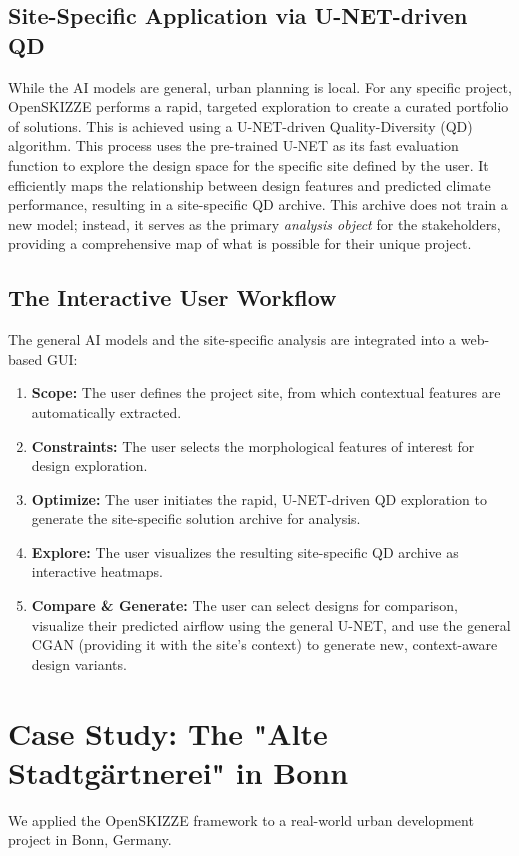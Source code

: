 \documentclass[times,final]{elsarticle}
\begin{document}
\subsection{Site-Specific Application via U-NET-driven QD}
While the AI models are general, urban planning is local. For any specific project, OpenSKIZZE performs a rapid, targeted exploration to create a curated portfolio of solutions. This is achieved using a U-NET-driven Quality-Diversity (QD) algorithm. This process uses the pre-trained U-NET as its fast evaluation function to explore the design space for the specific site defined by the user. It efficiently maps the relationship between design features and predicted climate performance, resulting in a site-specific QD archive. This archive does not train a new model; instead, it serves as the primary \textit{analysis object} for the stakeholders, providing a comprehensive map of what is possible for their unique project.

\subsection{The Interactive User Workflow}
The general AI models and the site-specific analysis are integrated into a web-based GUI:
\begin{enumerate}
    \item \textbf{Scope:} The user defines the project site, from which contextual features are automatically extracted.
    \item \textbf{Constraints:} The user selects the morphological features of interest for design exploration.
    \item \textbf{Optimize:} The user initiates the rapid, U-NET-driven QD exploration to generate the site-specific solution archive for analysis.
    \item \textbf{Explore:} The user visualizes the resulting site-specific QD archive as interactive heatmaps.
    \item \textbf{Compare \& Generate:} The user can select designs for comparison, visualize their predicted airflow using the general U-NET, and use the general CGAN (providing it with the site's context) to generate new, context-aware design variants.
\end{enumerate}

\section{Case Study: The "Alte Stadtgärtnerei" in Bonn}
We applied the OpenSKIZZE framework to a real-world urban development project in Bonn, Germany.
\end{document}
